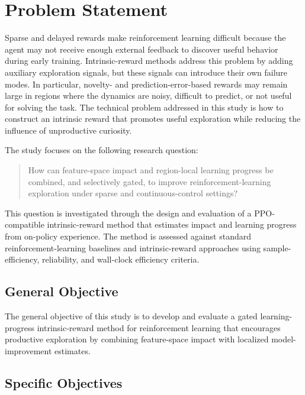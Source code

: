 \section{Problem Statement}
\label{sec:problem_statement}

Sparse and delayed rewards make reinforcement learning difficult because the agent may not receive enough external feedback to discover useful behavior during early training.
Intrinsic-reward methods address this problem by adding auxiliary exploration signals, but these signals can introduce their own failure modes.
In particular, novelty- and prediction-error-based rewards may remain large in regions where the dynamics are noisy, difficult to predict, or not useful for solving the task.
The technical problem addressed in this study is how to construct an intrinsic reward that promotes useful exploration while reducing the influence of unproductive curiosity.

The study focuses on the following research question:

\begin{quote}
How can feature-space impact and region-local learning progress be combined, and selectively gated, to improve reinforcement-learning exploration under sparse and continuous-control settings?
\end{quote}

This question is investigated through the design and evaluation of a PPO-compatible intrinsic-reward method that estimates impact and learning progress from on-policy experience.
The method is assessed against standard reinforcement-learning baselines and intrinsic-reward approaches using sample-efficiency, reliability, and wall-clock efficiency criteria.

\subsection{General Objective}
\label{subsec:general_objective}

The general objective of this study is to develop and evaluate a gated learning-progress intrinsic-reward method for reinforcement learning that encourages productive exploration by combining feature-space impact with localized model-improvement estimates.

\subsection{Specific Objectives}
\label{subsec:specific_objectives}

